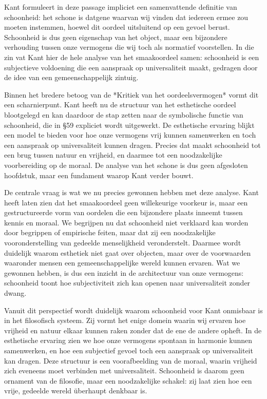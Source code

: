 \begin{mdframed}[leftmargin=0pt,rightmargin=0pt,backgroundcolor=blue!6,linecolor=white,innertopmargin=6pt,innerbottommargin=6pt]
\bigskip
Kant formuleert in deze passage impliciet een samenvattende definitie van schoonheid: het schone is datgene waarvan wij vinden dat iedereen ermee zou moeten instemmen, hoewel dit oordeel uitsluitend op een gevoel berust. Schoonheid is dus geen eigenschap van het object, maar een bijzondere verhouding tussen onze vermogens die wij toch als normatief voorstellen. In die zin vat Kant hier de hele analyse van het smaakoordeel samen: schoonheid is een subjectieve voldoening die een aanspraak op universaliteit maakt, gedragen door de idee van een gemeenschappelijk zintuig.

Binnen het bredere betoog van de *Kritiek van het oordeelsvermogen* vormt dit een scharnierpunt. Kant heeft nu de structuur van het esthetische oordeel blootgelegd en kan daardoor de stap zetten naar de symbolische functie van schoonheid, die in §59 expliciet wordt uitgewerkt. De esthetische ervaring blijkt een model te bieden voor hoe onze vermogens vrij kunnen samenwerken en toch een aanspraak op universaliteit kunnen dragen. Precies dat maakt schoonheid tot een brug tussen natuur en vrijheid, en daarmee tot een noodzakelijke voorbereiding op de moraal. De analyse van het schone is dus geen afgesloten hoofdstuk, maar een fundament waarop Kant verder bouwt.

De centrale vraag is wat we nu precies gewonnen hebben met deze analyse. Kant heeft laten zien dat het smaakoordeel geen willekeurige voorkeur is, maar een gestructureerde vorm van oordelen die een bijzondere plaats inneemt tussen kennis en moraal. We begrijpen nu dat schoonheid niet verklaard kan worden door begrippen of empirische feiten, maar dat zij een noodzakelijke vooronderstelling van gedeelde menselijkheid veronderstelt. Daarmee wordt duidelijk waarom esthetiek niet gaat over objecten, maar over de voorwaarden waaronder mensen een gemeenschappelijke wereld kunnen ervaren. Wat we gewonnen hebben, is dus een inzicht in de architectuur van onze vermogens: schoonheid toont hoe subjectiviteit zich kan openen naar universaliteit zonder dwang.

Vanuit dit perspectief wordt duidelijk waarom schoonheid voor Kant onmisbaar is in het filosofisch systeem. Zij vormt het enige domein waarin wij ervaren hoe vrijheid en natuur elkaar kunnen raken zonder dat de ene de andere opheft. In de esthetische ervaring zien we hoe onze vermogens spontaan in harmonie kunnen samenwerken, en hoe een subjectief gevoel toch een aanspraak op universaliteit kan dragen. Deze structuur is een voorafbeelding van de moraal, waarin vrijheid zich eveneens moet verbinden met universaliteit. Schoonheid is daarom geen ornament van de filosofie, maar een noodzakelijke schakel: zij laat zien hoe een vrije, gedeelde wereld überhaupt denkbaar is.
\end{mdframed}

